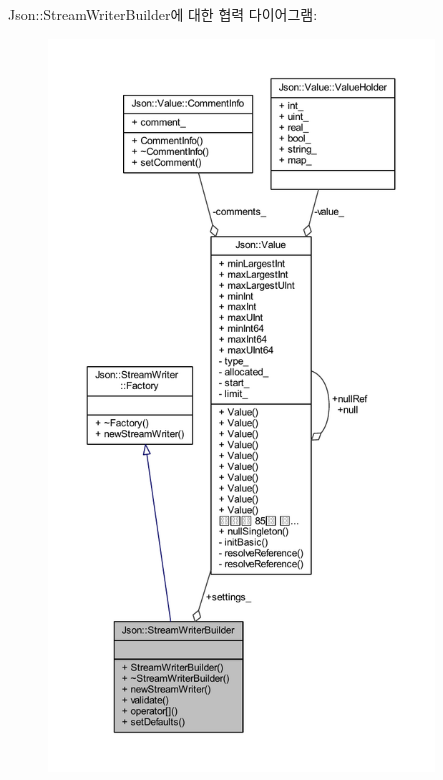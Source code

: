 Json\+:\+:Stream\+Writer\+Builder에 대한 협력 다이어그램\+:
\nopagebreak
\begin{figure}[H]
\begin{center}
\leavevmode
\includegraphics[height=550pt]{class_json_1_1_stream_writer_builder__coll__graph}
\end{center}
\end{figure}
